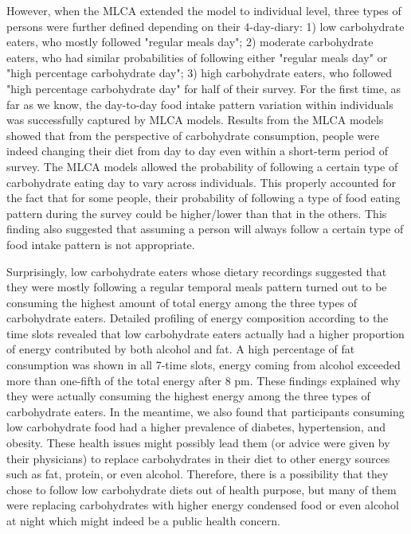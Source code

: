 However, when the MLCA extended the model to individual level, three types of persons were further defined depending on their 4-day-diary: 1) low carbohydrate eaters, who mostly followed "regular meals day"; 2) moderate carbohydrate eaters, who had similar probabilities of following either "regular meals day" or "high percentage carbohydrate day"; 3) high carbohydrate eaters, who followed "high percentage carbohydrate day" for half of their survey. For the first time, as far as we know, the day-to-day food intake pattern variation within individuals was successfully captured by MLCA models. Results from the MLCA models showed that from the perspective of carbohydrate consumption, people were indeed changing their diet from day to day even within a short-term period of survey. The MLCA models allowed the probability of following a certain type of carbohydrate eating day to vary across individuals. This properly accounted for the fact that for some people, their probability of following a type of food eating pattern during the survey could be higher/lower than that in the others. This finding also suggested that assuming a person will always follow a certain type of food intake pattern is not appropriate.

Surprisingly, low carbohydrate eaters whose dietary recordings suggested that they were mostly following a regular temporal meals pattern turned out to be consuming the highest amount of total energy among the three types of carbohydrate eaters. Detailed profiling of energy composition according to the time slots revealed that low carbohydrate eaters actually had a higher proportion of energy contributed by both alcohol and fat. A high percentage of fat consumption was shown in all 7-time slots, energy coming from alcohol exceeded more than one-fifth of the total energy after 8 pm. These findings explained why they were actually consuming the highest energy among the three types of carbohydrate eaters. In the meantime, we also found that participants consuming low carbohydrate food had a higher prevalence of diabetes, hypertension, and obesity. These health issues might possibly lead them (or advice were given by their physicians) to replace carbohydrates in their diet to other energy sources such as fat, protein, or even alcohol. Therefore, there is a possibility that they chose to follow low carbohydrate diets out of health purpose, but many of them were replacing carbohydrates with higher energy condensed food or even alcohol at night which might indeed be a public health concern. 

